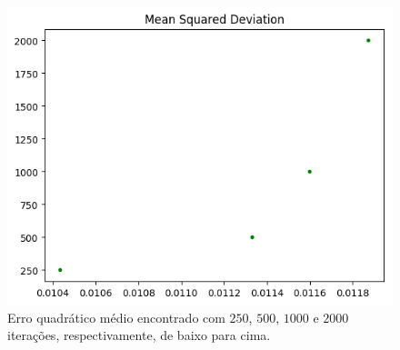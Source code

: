 \documentclass{article}
\begin{document}
\begin{figure}[H]
	\includegraphics[width=\linewidth]{fig7_250.png}
	\centering
	
	\caption{Erro quadrático médio encontrado com $250$, $500$, $1000$ e $2000$ iterações, respectivamente, de baixo para cima.}
	\label{}
\end{figure}

\end{document}
